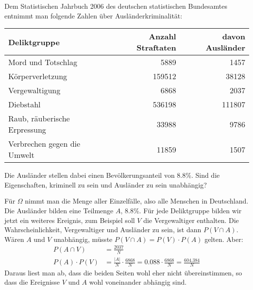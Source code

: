 Dem Statistischen Jahrbuch 2006 des deutschen statistischen Bundesamtes
entnimmt man folgende Zahlen über Ausländerkriminalität:
\begin{center}
\begin{tabular}{|l|r|r|}
\hline
Deliktgruppe&Anzahl Straftaten&davon Ausländer\\
\hline
Mord und Totschlag           &  5889&  1457\\
Körperverletzung            &159512& 38128\\
Vergewaltigung               &  6868&  2037\\
Diebstahl                    &536198&111807\\
Raub, räuberische Erpressung& 33988&  9786\\
Verbrechen gegen die Umwelt  & 11859&  1507\\
\hline
\end{tabular}
\end{center}
Die Ausländer stellen dabei einen Bevölkerungsanteil von 8.8\%.
Sind die Eigenschaften, kriminell zu sein und Ausländer zu sein
unabhängig?


\begin{loesung}
Für $\Omega$ nimmt man die Menge aller Einzelfälle, also alle
Menschen in Deutschland. Die Ausländer bilden eine Teilmenge $A$,
8.8\%. Für jede Deliktgruppe bilden wir jetzt ein weiteres Ereignis,
zum Beispiel soll $V$ die Vergewaltiger enthalten. Die Wahrscheinlichkeit,
Vergewaltiger und Ausländer zu sein, ist dann $P(V\cap A)$. Wären
$A$ und $V$ unabhängig, müsste $P(V\cap A)=P(V)\cdot P(A)$ gelten.
Aber:
\begin{align*}
P(A\cap V)&=\frac{2037}{N}\\
P(A)\cdot P(V)&=\frac{|A|}{N}\cdot\frac{6868}{N}=0.088\cdot \frac{6868}{N}=\frac{604.384}{N}
\end{align*}
Daraus liest man ab, dass die beiden Seiten wohl eher nicht übereinstimmen,
so dass die Ereignisse $V$ und $A$ wohl voneinander abhängig sind.
\end{loesung}


